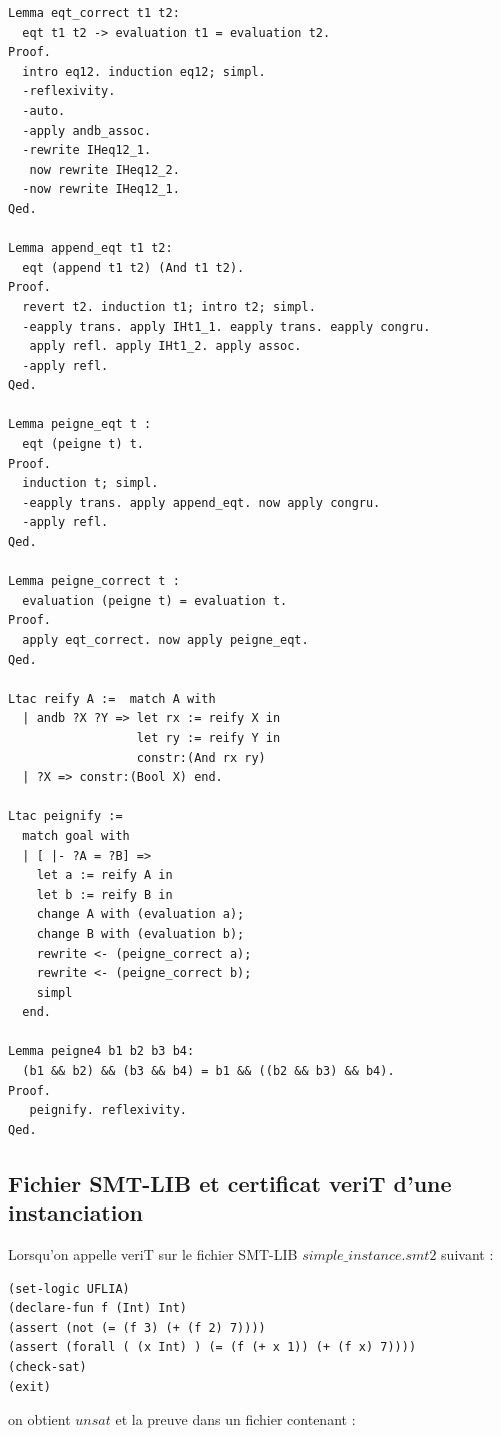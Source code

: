 \documentclass[11pt]{article}
\begin{document}
\begin{lstlisting}[frame=single]
Lemma eqt_correct t1 t2:
  eqt t1 t2 -> evaluation t1 = evaluation t2.
Proof.
  intro eq12. induction eq12; simpl.
  -reflexivity.
  -auto.
  -apply andb_assoc.
  -rewrite IHeq12_1.
   now rewrite IHeq12_2.
  -now rewrite IHeq12_1.
Qed.

Lemma append_eqt t1 t2:
  eqt (append t1 t2) (And t1 t2).
Proof.
  revert t2. induction t1; intro t2; simpl.
  -eapply trans. apply IHt1_1. eapply trans. eapply congru.
   apply refl. apply IHt1_2. apply assoc.
  -apply refl.
Qed.

Lemma peigne_eqt t :
  eqt (peigne t) t.
Proof.
  induction t; simpl.
  -eapply trans. apply append_eqt. now apply congru.
  -apply refl.
Qed.

Lemma peigne_correct t :
  evaluation (peigne t) = evaluation t.
Proof.
  apply eqt_correct. now apply peigne_eqt.
Qed. 

Ltac reify A :=  match A with
  | andb ?X ?Y => let rx := reify X in
                  let ry := reify Y in
                  constr:(And rx ry)
  | ?X => constr:(Bool X) end.

Ltac peignify :=
  match goal with
  | [ |- ?A = ?B] =>
    let a := reify A in
    let b := reify B in
    change A with (evaluation a);
    change B with (evaluation b);
    rewrite <- (peigne_correct a);
    rewrite <- (peigne_correct b);
    simpl
  end.

Lemma peigne4 b1 b2 b3 b4:
  (b1 && b2) && (b3 && b4) = b1 && ((b2 && b3) && b4).
Proof.
   peignify. reflexivity.
Qed.
\end{lstlisting}

\subsection{Fichier SMT-LIB et certificat veriT d'une instanciation} \label{annexe_instanciation}

\lstset{language=Java}

Lorsqu'on appelle veriT sur le fichier SMT-LIB $simple\_instance.smt2$ suivant : 
\begin{lstlisting}[frame=single]
(set-logic UFLIA)
(declare-fun f (Int) Int)
(assert (not (= (f 3) (+ (f 2) 7))))
(assert (forall ( (x Int) ) (= (f (+ x 1)) (+ (f x) 7))))
(check-sat)
(exit)
\end{lstlisting}

on obtient $unsat$ et la preuve dans un fichier contenant : 
\end{document}
